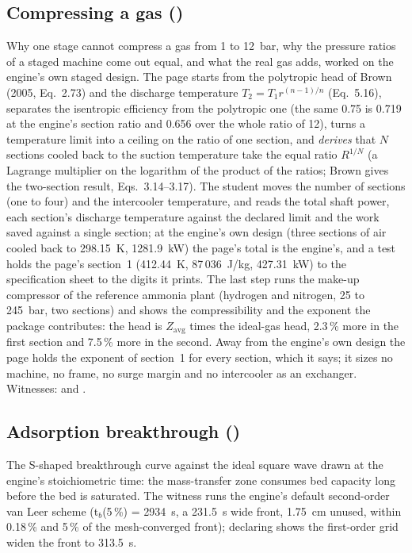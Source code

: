 \documentclass[11pt,a4paper]{article}
\begin{document}
\subsection*{Compressing a gas \quad()}\label{sec:edu-compression}
Why one stage cannot compress a gas from 1 to 12~bar, why the pressure ratios
of a staged machine come out equal, and what the real gas adds, worked on the
engine's own staged design.  The page starts from the polytropic head of
Brown (2005, Eq.~2.73) and the discharge temperature $T_2 = T_1
r^{(n-1)/n}$ (Eq.~5.16), separates the isentropic efficiency from the
polytropic one (the same 0.75 is 0.719 at the engine's section ratio and
0.656 over the whole ratio of 12), turns a temperature limit into a ceiling
on the ratio of one section, and \emph{derives} that $N$ sections cooled
back to the suction temperature take the equal ratio $R^{1/N}$ (a Lagrange
multiplier on the logarithm of the product of the ratios; Brown gives the
two-section result, Eqs.~3.14--3.17).  The student moves the number of
sections (one to four) and the intercooler temperature, and reads the total
shaft power, each section's discharge temperature against the declared limit
and the work saved against a single section; at the engine's own design
(three sections of air cooled back to 298.15~K, 1281.9~kW) the page's total
is the engine's, and a test holds the page's section~1 (412.44~K, 87\,036~J/kg,
427.31~kW) to the specification sheet to the digits it prints.  The last step
runs the make-up compressor of the reference ammonia plant (hydrogen and
nitrogen, 25 to 245~bar, two sections) and shows the compressibility and the
exponent the package contributes: the head is $Z_\mathrm{avg}$ times the
ideal-gas head, 2.3\,\% more in the first section and 7.5\,\% more in the
second.  Away from the engine's own design the page holds the exponent of
section~1 for every section, which it says; it sizes no machine, no frame, no
surge margin and no intercooler as an exchanger.  Witnesses:
 and
.

\subsection*{Adsorption breakthrough \quad()}
The S-shaped breakthrough curve against the ideal square wave drawn at the
engine's stoichiometric time: the mass-transfer zone consumes bed capacity
long before the bed is saturated.  The witness runs the engine's default
second-order van Leer scheme (t$_b$(5\,\%) = 2934~s, a 231.5~s wide front,
1.75~cm unused, within 0.18\,\% and 5\,\% of the mesh-converged front);
declaring  shows the first-order grid widen
the front to 313.5~s.
\end{document}
